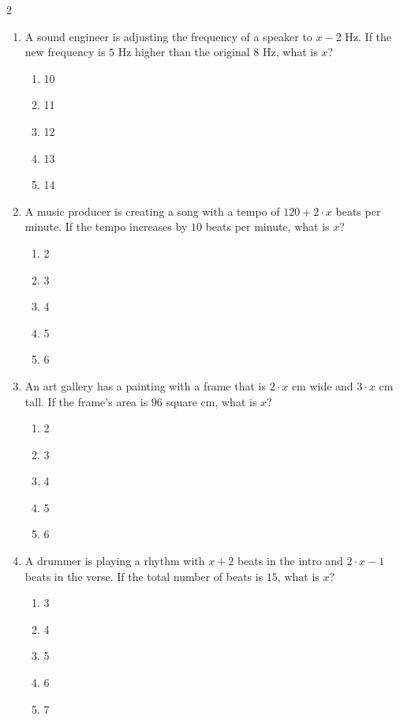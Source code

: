 \documentclass[10pt]{article}
\begin{document}
\begin{multicols}{2}
\begin{enumerate}[label=\textbf{Q\arabic*.}, leftmargin=*, itemsep=6pt, parsep=0pt]
  \item \small A sound engineer is adjusting the frequency of a speaker to $x - 2$ Hz. If the new frequency is $5$ Hz higher than the original $8$ Hz, what is $x$?
  \begin{enumerate}[label=(\Alph*), leftmargin=0.6cm, nosep, itemsep=2pt]
    \item 10
    \item 11
    \item 12
    \item 13
    \item 14
  \end{enumerate}

  \item \small A music producer is creating a song with a tempo of $120 + 2 \cdot x$ beats per minute. If the tempo increases by $10$ beats per minute, what is $x$?
  \begin{enumerate}[label=(\Alph*), leftmargin=0.6cm, nosep, itemsep=2pt]
    \item 2
    \item 3
    \item 4
    \item 5
    \item 6
  \end{enumerate}

  \item \small An art gallery has a painting with a frame that is $2 \cdot x$ cm wide and $3 \cdot x$ cm tall. If the frame's area is $96$ square cm, what is $x$?
  \begin{enumerate}[label=(\Alph*), leftmargin=0.6cm, nosep, itemsep=2pt]
    \item 2
    \item 3
    \item 4
    \item 5
    \item 6
  \end{enumerate}

  \item \small A drummer is playing a rhythm with $x + 2$ beats in the intro and $2 \cdot x - 1$ beats in the verse. If the total number of beats is $15$, what is $x$?
  \begin{enumerate}[label=(\Alph*), leftmargin=0.6cm, nosep, itemsep=2pt]
    \item 3
    \item 4
    \item 5
    \item 6
    \item 7
  \end{enumerate}


\end{enumerate}
\end{multicols}
\end{document}

